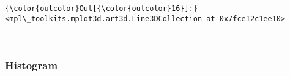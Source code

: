 \documentclass{article}
\begin{document}
            \begin{Verbatim}[commandchars=\\\{\}]
{\color{outcolor}Out[{\color{outcolor}16}]:} <mpl\_toolkits.mplot3d.art3d.Line3DCollection at 0x7fce12c1ee10>
\end{Verbatim}
        
    \begin{center}
    \end{center}
    { \hspace*{\fill} \\}
    
    


    \subsubsection{Histogram}
\end{document}
